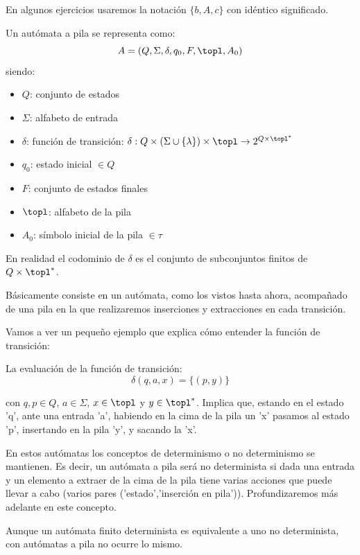 \documentclass{apuntes}
\begin{document}
En algunos ejercicios usaremos la notación $\{b,A,c\}$ con idéntico significado.

\newpage
\begin{defn}
Un autómata a pila se representa como:
\[A=(Q, \Sigma, \delta, q_0, F, \topl, A_0)\]
siendo:
\begin{itemize}
\item $Q$: conjunto de estados
\item $\Sigma$: alfabeto de entrada
\item $\delta$: función de transición: $\delta:Q\times(\Sigma \cup \{\lambda\})\times \topl \rightarrow 2^{Q\times \topl^*}$
\item $q_0$: estado inicial $\in Q$
\item $F$: conjunto de estados finales
\item $\topl$: alfabeto de la pila
\item $A_0$: símbolo inicial de la pila $\in \tau$
\end{itemize}

 En realidad el codominio de $\delta$ es el conjunto de subconjuntos finitos de $Q\times \topl^*$.

Básicamente consiste en un autómata, como los vistos hasta ahora, acompañado de una pila en la que realizaremos inserciones y extracciones en cada transición.
\end{defn}

Vamos a ver un pequeño ejemplo que explica cómo entender la función de transición:
\begin{example}
La evaluación de la función de transición:
\[\delta(q,a,x)=\{(p,y)\}\]

\noindent con $q, p \in Q$, $a \in \Sigma$, $x \in \topl$ y $y \in \topl^{*}$.
Implica que, estando en el estado 'q', ante una entrada 'a', habiendo en la cima de la pila un 'x' pasamos al estado 'p', insertando en la pila 'y', y sacando la 'x'.
\end{example}

En estos autómatas los conceptos de determinismo o no determinismo se mantienen. Es decir, un autómata a pila será no determinista si dada una entrada y un elemento a extraer de la cima de la pila tiene varias acciones que puede llevar a cabo (varios pares ('estado','inserción en pila')). Profundizaremos más adelante en este concepto.

\obs Aunque un autómata finito determinista es equivalente a uno no determinista, con autómatas a pila no ocurre lo mismo.
\end{document}
